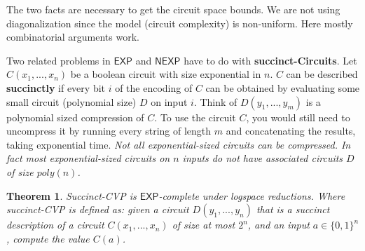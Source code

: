 \documentclass[twoside]{article}
\newcounter{lecnum}
\newtheorem{theorem}{Theorem}[lecnum]
\def\EXP{\mathsf{EXP}}
\def\NEXP{\mathsf{NEXP}}
\begin{document}
The two facts are necessary to get the circuit space bounds. We are not using diagonalization since the model (circuit complexity) is non-uniform. Here mostly combinatorial arguments work. 

Two related problems in $\EXP$ and $\NEXP$ have to do with \textbf{succinct-Circuits}. Let $C(x_1, ..., x_n)$ be a boolean circuit with size exponential in $n$. $C$ can be described \textbf{succinctly} if every bit $i$ of the encoding of $C$ can be obtained by evaluating some small circuit (polynomial size) $D$ on input $i$. Think of $D(y_1, ..., y_m)$ is a polynomial sized compression of $C$. To use the circuit $C$, you would still need to uncompress it by running every string of length $m$ and concatenating the results, taking exponential time. \emph{Not all exponential-sized circuits can be compressed. In fact most exponential-sized circuits on $n$ inputs do not have associated circuits $D$ of size $poly(n)$.}

\begin{theorem}
Succinct-CVP is $\EXP$-complete under logspace reductions. Where succinct-CVP is defined as: given a circuit $D(y_1, ..., y_n)$ that is a succinct description of a circuit $C(x_1, ..., x_n)$ of size at most $2^n$, and an input $a \in \{0,1\}^n$, compute the value $C(a)$. 
\end{theorem} 
\end{document}

